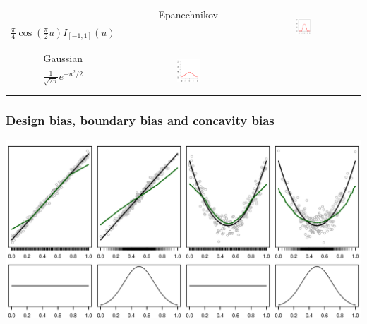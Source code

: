 \documentclass[pdf]{beamer}\usepackage[]{graphicx}\usepackage[]{color}
\makeatletter
\def\maxwidth{ %
  \ifdim\Gin@nat@width>\linewidth
    \linewidth
  \else
    \Gin@nat@width
  \fi
}
\newenvironment{knitrout}{}{} %
\makeatother
\begin{document}
\begin{frame}
{\begin{tabular}{cccc}
{}%
& 
Epanechnikov &
\multirow{4}{*}{
\includegraphics[width=0.18\textwidth]{figure/epanechnikov-1}
}%
\\
$\frac{\pi}{4}\cos\left(\frac{\pi}{2}u\right)I_{[-1,1]}(u)$ & &    $\frac{3}{4}(1-u^2)I_{[-1,1]}(u)$  & \\ & & & \\ & & & \\
Gaussian &
\multirow{4}{*}{
\includegraphics[width=0.18\textwidth]{figure/gaussian-1}
}%
& 
 &
\multirow{4}{*}{}%
\\
$\frac{1}{\sqrt{2\pi}} e^{-u^2/2}$ & &      & \\ & & & \\ & & & \\

\end{tabular}
}

\end{frame}

\begin{frame}
\frametitle{Design bias, boundary bias and concavity bias}

\begin{knitrout}
\color{fgcolor}

{\centering \includegraphics[width=\maxwidth]{figure/nw_bias-1} 

}



\end{knitrout}



\end{frame}
\end{document}
